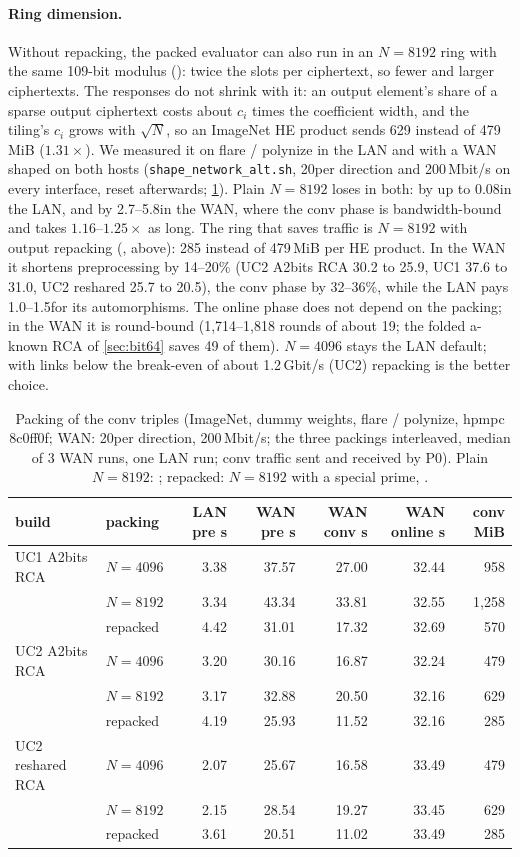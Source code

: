 \paragraph{Ring dimension.} Without repacking, the packed evaluator can also run in an $N = 8192$ ring with the same
109-bit modulus (): twice the slots per ciphertext, so fewer and larger ciphertexts.
The responses do not shrink with it: an output element's share of a sparse output ciphertext costs about $c_i$ times
the coefficient width, and the tiling's $c_i$ grows with $\sqrt{N}$, so an ImageNet HE product sends 629 instead of
479\,MiB ($1.31\times$). We measured it on flare / polynize in the LAN and with a WAN shaped on both hosts
(\texttt{shape\_network\_alt.sh}, 20\ms per direction and 200\,Mbit/s on every interface, reset afterwards;
\cref{tab:polyn}). Plain $N = 8192$ loses in both: by up to 0.08\s in the LAN, and by 2.7--5.8\s in the WAN, where the
conv phase is bandwidth-bound and takes $1.16$--$1.25\times$ as long. The ring that saves traffic is $N = 8192$ with output
repacking (, above): 285 instead of 479\,MiB per HE product. In the WAN it shortens
preprocessing by 14--20\% (UC2 A2bits RCA 30.2 to 25.9\s, UC1 37.6 to 31.0\s, UC2 reshared 25.7 to 20.5\s), the conv
phase by 32--36\%, while the LAN pays 1.0--1.5\s for its automorphisms. The online phase does not depend on the packing;
in the WAN it is round-bound (1,714--1,818 rounds of about 19\ms; the folded a-known RCA of \cref{sec:bit64} saves 49 of
them). $N = 4096$ stays the LAN default; with links below the break-even of about 1.2\,Gbit/s (UC2) repacking is the
better choice.

\begin{table}[t]
\centering\small
\begin{tabular}{@{}llrrrrr@{}}
\toprule
build & packing & LAN pre s & WAN pre s & WAN conv s & WAN online s & conv MiB\\
\midrule
UC1 A2bits RCA & $N = 4096$ & 3.38 & 37.57 & 27.00 & 32.44 & 958\\
 & $N = 8192$ & 3.34 & 43.34 & 33.81 & 32.55 & 1{,}258\\
 & repacked & 4.42 & 31.01 & 17.32 & 32.69 & 570\\
UC2 A2bits RCA & $N = 4096$ & 3.20 & 30.16 & 16.87 & 32.24 & 479\\
 & $N = 8192$ & 3.17 & 32.88 & 20.50 & 32.16 & 629\\
 & repacked & 4.19 & 25.93 & 11.52 & 32.16 & 285\\
UC2 reshared RCA & $N = 4096$ & 2.07 & 25.67 & 16.58 & 33.49 & 479\\
 & $N = 8192$ & 2.15 & 28.54 & 19.27 & 33.45 & 629\\
 & repacked & 3.61 & 20.51 & 11.02 & 33.49 & 285\\
\bottomrule
\end{tabular}
\caption{Packing of the conv triples (ImageNet, dummy weights, flare / polynize, hpmpc 8c0ff0f; WAN: 20\ms per direction,
200\,Mbit/s; the three packings interleaved, median of 3 WAN runs, one LAN run; conv traffic sent and received by P0).
Plain $N = 8192$: ; repacked: $N = 8192$ with a special prime, .}
\label{tab:polyn}
\end{table}
